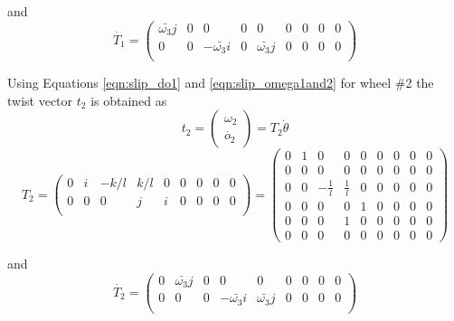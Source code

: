 and 
\begin{equation}
\label{eqn:slip_dT1}
\dot{T_1}=\begin{pmatrix}
\bar{\omega_3}j & 0& 0& 0 & 0 &0 & 0 &0 &0\\
0 & 0& -\bar{\omega_3}i& 0 & \bar{\omega_3}j &0 & 0 &0 &0\\ 
\end{pmatrix}
\end{equation}

Using Equations \ref{eqn:slip_do1} and \ref{eqn:slip_omega1and2} for wheel \#2 the twist vector $t_2$  is obtained as 
\begin{equation}
\label{eqn:slip_t2}
t_2=
\begin{pmatrix}
\omega_2\\
\dot{o_2}
\end{pmatrix}=T_2 \dot{\theta}
\end{equation} 
\begin{equation}
\label{eqn:slip_T2}
T_2=
\begin{pmatrix}
0 & i& -k/l & k/l & 0 &0 & 0 &0 &0\\
0 & 0& 0& j &i &0 & 0 &0 &0\\ 
\end{pmatrix}=
\left(
\begin{array}{ccccccccc}
0 & 1 & 0 & 0 & 0 & 0 & 0 & 0 & 0 \\
0 & 0 & 0 & 0 & 0 & 0 & 0 & 0 & 0 \\
0 & 0 & -\frac{1}{l} & \frac{1}{l} & 0 & 0 & 0 & 0 & 0 \\
0 & 0 & 0 & 0 & 1 & 0 & 0 & 0 & 0 \\
0 & 0 & 0 & 1 & 0 & 0 & 0 & 0 & 0 \\
0 & 0 & 0 & 0 & 0 & 0 & 0 & 0 & 0
\end{array}
\right)
\end{equation}

and 
\begin{equation}
\label{eqn:slip_dT2}
\dot{T_2}=\begin{pmatrix}
0 & \bar{\omega_3}j & 0& 0 & 0 &0 & 0 &0 &0\\
0 & 0& 0& -\bar{\omega_3}i & \bar{\omega_3}j &0 & 0 &0 &0\\ 
\end{pmatrix}
\end{equation}


